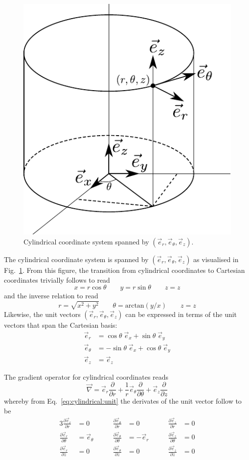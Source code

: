 \documentclass[times,namecite]{goose-article}
\begin{document}
\begin{figure}[htp]
  \centering
  \includegraphics[width=.3\textwidth]{figures/cylindrical_coordinates}
  \caption{Cylindrical coordinate system spanned by $(\vec{e}_r, \vec{e}_\theta, \vec{e}_z)$.}
  \label{fig:cylindrical}
\end{figure}

The cylindrical coordinate system is spanned by $(\vec{e}_r, \vec{e}_\theta, \vec{e}_z)$ as visualised in Fig.~\ref{fig:cylindrical}. From this figure, the transition from cylindrical coordinates to Cartesian coordinates trivially follows to read
\begin{equation}
  x = r \cos \theta \qquad
  y = r \sin \theta \qquad
  z = z
\end{equation}
and the inverse relation to read
\begin{equation}
  r      = \sqrt{ x^2 + y^2 }                \qquad
  \theta = \mathrm{arctan}\left( y/x \right) \qquad
  z      = z
\end{equation}
Likewise, the unit vectors $(\vec{e}_r, \vec{e}_\theta, \vec{e}_z)$ can be expressed in terms of the unit vectors that span the Cartesian basis:
\begin{align}
  \vec{e}_r      &=   \cos \theta \; \vec{e}_x + \sin \theta \; \vec{e}_y \nonumber \\
  \vec{e}_\theta &= - \sin \theta \; \vec{e}_x + \cos \theta \; \vec{e}_y \nonumber \\
  \vec{e}_z      &= \vec{e}_z \label{eq:cylindrical:unit}
\end{align}

The gradient operator for cylindrical coordinates reads
\begin{equation}
  \vec{\nabla} =
  \vec{e}_r \frac{\partial}{\partial r} +
  \frac{1}{r} \vec{e}_\theta \frac{\partial}{\partial \theta} +
  \vec{e}_z \frac{\partial}{\partial z}
\end{equation}
whereby from Eq.~\eqref{eq:cylindrical:unit} the derivates of the unit vector follow to be
\begin{alignat}{3}
  \frac{\partial \vec{e}_r}{\partial r     } &= 0              &\qquad \frac{\partial \vec{e}_\theta}{\partial r     } &= 0           &\qquad \frac{\partial \vec{e}_z}{\partial r     } &= 0 \nonumber \\
  \frac{\partial \vec{e}_r}{\partial \theta} &= \vec{e}_\theta &\qquad \frac{\partial \vec{e}_\theta}{\partial \theta} &= - \vec{e}_r &\qquad \frac{\partial \vec{e}_z}{\partial \theta} &= 0 \nonumber \\
  \frac{\partial \vec{e}_r}{\partial z     } &= 0              &\qquad \frac{\partial \vec{e}_\theta}{\partial z     } &= 0           &\qquad \frac{\partial \vec{e}_z}{\partial z     } &= 0
\end{alignat}
\end{document}
